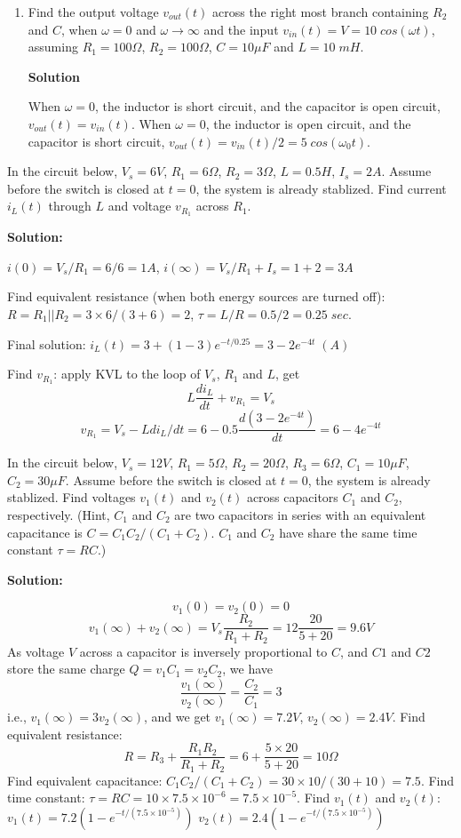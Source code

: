 \begin{enumerate}
\item Find the output voltage $v_{out}(t)$ across the right most branch
containing $R_2$ and $C$, when $\omega=0$ and $\omega\rightarrow \infty$ 
and the input $v_{in}(t)=V=10\;cos(\omega t)$, assuming $R_1=100\Omega$, 
$R_2=100\Omega$, $C=10\mu F$ and $L=10\;mH$.


 {\bf Solution}
 
 When $\omega=0$, the inductor is short circuit, and the capacitor is
 open circuit, $v_{out}(t)=v_{in}(t)$.
 When $\omega=0$, the inductor is open circuit, and the capacitor is
 short circuit, $v_{out}(t)=v_{in}(t)/2=5\;cos(\omega_0 t)$.

\end{enumerate}



\item In the circuit below, $V_s=6V$, $R_1=6\Omega$, $R_2=3\Omega$,
$L=0.5H$, $I_s=2A$. Assume before the switch is closed at $t=0$, the
system is already stablized. Find current $i_L(t)$ through $L$ and 
voltage $v_{R_1}$ across $R_1$.


{\bf Solution:}

 $i(0)=V_s/R_1=6/6=1A$, $i(\infty)=V_s/R_1+I_s=1+2=3A$

 Find equivalent resistance (when both energy sources are turned off):
 $R=R_1 || R_2=3\times 6/(3+6)=2$, $\tau=L/R=0.5/2=0.25\;sec.$

 Final solution:
 $i_L(t)=3+(1-3)e^{-t/0.25}=3-2 e^{-4t} \; (A)$

 Find $v_{R_1}$: apply KVL to the loop of $V_s$, $R_1$ and $L$, get
 \[ L\frac{di_L}{dt}+v_{R_1}=V_s	\]
 \[ v_{R_1}=V_s-L di_L/dt=6-0.5 \frac{d(3-2 e^{-4t})}{dt}=6-4e^{-4t}	\]

\item In the circuit below, $V_s=12V$, $R_1=5\Omega$, $R_2=20\Omega$,
$R_3=6\Omega$, $C_1=10\mu F$, $C_2=30\mu F$. Assume before the switch 
is closed at $t=0$, the system is already stablized. Find voltages
$v_1(t)$ and $v_2(t)$ across capacitors $C_1$ and $C_2$, respectively.
(Hint, $C_1$ and $C_2$ are two capacitors in series with an equivalent
capacitance is $C=C_1 C_2/(C_1+C_2)$. $C_1$ and $C_2$ have share the same
time constant $\tau=RC$.)


{\bf Solution:}

 \[ v_1(0)=v_2(0)=0	\]
 \[ v_1(\infty)+v_2(\infty)=V_s \frac{R_2}{R_1+R_2}
 	=12 \frac{20}{5+20}=9.6V	\]
 As voltage $V$ across a capacitor is inversely proportional to $C$, and 
 $C1$ and $C2$ store the same charge $Q=v_1C_1=v_2C_2$, we have
 \[	\frac{v_1(\infty)}{v_2(\infty)}=\frac{C_2}{C_1}=3	\]
 i.e., $v_1(\infty)=3v_2(\infty)$, and we get $v_1(\infty)=7.2V$,
 $v_2(\infty)=2.4V$.
 Find equivalent resistance: 
 \[ R=R_3+\frac{R_1 R_2}{R_1+R_2}=6+\frac{5\times 20}{5+20}=10\Omega \]
 Find equivalent capacitance: $C_1 C_2/(C_1+C_2)=30\times 10/(30+10)=7.5$. 
 Find time constant: $\tau=RC=10\times 7.5\times 10^{-6}=7.5\times 10^{-5}$.
 Find $v_1(t)$ and $v_2(t)$:
 $v_1(t)=7.2(1-e^{-t/(7.5\times 10^{-5})})$
 $v_2(t)=2.4(1-e^{-t/(7.5\times 10^{-5})})$

